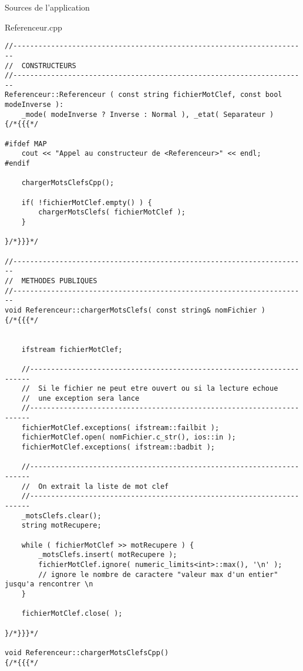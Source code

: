 \documentclass{article}
\begin{document}
\begin{section}{Sources de l'application}
\begin{paragraph}{Referenceur.cpp}
\begin{verbatim}
//----------------------------------------------------------------------
//  CONSTRUCTEURS
//----------------------------------------------------------------------
Referenceur::Referenceur ( const string fichierMotClef, const bool modeInverse ):
    _mode( modeInverse ? Inverse : Normal ), _etat( Separateur )
{/*{{{*/

#ifdef MAP
    cout << "Appel au constructeur de <Referenceur>" << endl;
#endif

    chargerMotsClefsCpp();

    if( !fichierMotClef.empty() ) {
        chargerMotsClefs( fichierMotClef );
    }

}/*}}}*/

//----------------------------------------------------------------------
//  METHODES PUBLIQUES
//----------------------------------------------------------------------
void Referenceur::chargerMotsClefs( const string& nomFichier )
{/*{{{*/


    ifstream fichierMotClef;

    //----------------------------------------------------------------------
    //  Si le fichier ne peut etre ouvert ou si la lecture echoue
    //  une exception sera lance
    //----------------------------------------------------------------------
    fichierMotClef.exceptions( ifstream::failbit );
    fichierMotClef.open( nomFichier.c_str(), ios::in );
    fichierMotClef.exceptions( ifstream::badbit );

    //----------------------------------------------------------------------
    //  On extrait la liste de mot clef
    //----------------------------------------------------------------------
    _motsClefs.clear();
    string motRecupere;

    while ( fichierMotClef >> motRecupere ) {
        _motsClefs.insert( motRecupere );
        fichierMotClef.ignore( numeric_limits<int>::max(), '\n' );
        // ignore le nombre de caractere "valeur max d'un entier" jusqu'a rencontrer \n
    }

    fichierMotClef.close( );

}/*}}}*/

void Referenceur::chargerMotsClefsCpp()
{/*{{{*/


\end{verbatim}
\end{paragraph}
\end{section}
\end{document}
